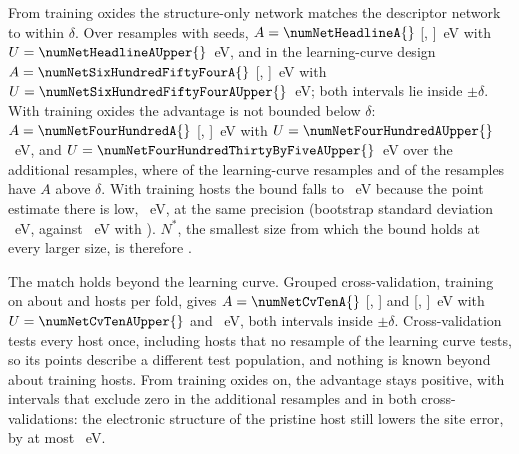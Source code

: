 From \numNetNStar{} training oxides the structure-only network matches the descriptor network to within $\delta$. Over \numPrecisionABFourHundredBSixHundredFiftyFourSubsetsThirtyXFiveNResamples{} resamples with \numPrecisionABFourHundredBSixHundredFiftyFourSubsetsThirtyXFiveNSeeds{} seeds, $A = \numNetHeadlineA{}$ [\numNetHeadlineALo{}, \numNetHeadlineAHi{}]~eV with $U = \numNetHeadlineAUpper{}$~eV, and in the learning-curve design $A = \numNetSixHundredFiftyFourA{}$ [\numNetSixHundredFiftyFourALo{}, \numNetSixHundredFiftyFourAHi{}]~eV with $U = \numNetSixHundredFiftyFourAUpper{}$~eV; both intervals lie inside $\pm\delta$. With \numCfgBudgetsHostsItemFive{} training oxides the advantage is not bounded below $\delta$: $A = \numNetFourHundredA{}$ [\numNetFourHundredALo{}, \numNetFourHundredAHi{}]~eV with $U = \numNetFourHundredAUpper{}$~eV, and $U = \numNetFourHundredThirtyByFiveAUpper{}$~eV over the additional resamples, where \numNetSpreadFourHundredNAboveDelta{} of the \numCfgSplitNOuterResamples{} learning-curve resamples and \numNetSpreadFourHundredThirtyByFiveNAboveDelta{} of the \numPrecisionABFourHundredBSixHundredFiftyFourSubsetsThirtyXFiveNResamples{} resamples have $A$ above $\delta$. With \numCfgBudgetsHostsItemFour{} training hosts the bound falls to \numNetTwoHundredAUpper{}~eV because the point estimate there is low, \numNetTwoHundredA{}~eV, at the same precision (bootstrap standard deviation \numNetSpreadTwoHundredBootSd{}~eV, against \numNetSpreadFourHundredBootSd{}~eV with \numCfgBudgetsHostsItemFive{}). $N^{*}$, the smallest size from which the bound holds at every larger size, is therefore \numNetNStar{}.

The match holds beyond the learning curve. Grouped cross-validation, training on about \numNetCvTenHosts{} and \numNetCvTwentyHosts{} hosts per fold, gives $A = \numNetCvTenA{}$ [\numNetCvTenALo{}, \numNetCvTenAHi{}] and \numNetCvTwentyA{} [\numNetCvTwentyALo{}, \numNetCvTwentyAHi{}]~eV with $U = \numNetCvTenAUpper{}$ and \numNetCvTwentyAUpper{}~eV, both intervals inside $\pm\delta$. Cross-validation tests every host once, including hosts that no resample of the learning curve tests, so its points describe a different test population, and nothing is known beyond about \numNetCvTwentyHosts{} training hosts. From \numNetNStar{} training oxides on, the advantage stays positive, with intervals that exclude zero in the additional resamples and in both cross-validations: the electronic structure of the pristine host still lowers the site error, by at most \numNetHeadlineAUpper{}~eV.

